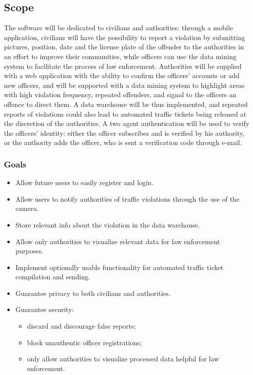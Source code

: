 \documentclass[12pt,a4paper]{article}
\begin{document}
\subsection{Scope}
The software will be dedicated to civilians and authorities: through a mobile application, civilians will have the possibility to report a violation by submitting pictures, position, date and the license plate of the offender to the authorities in an effort to improve their communities, while officers can use the data mining system to facilitate the process of law enforcement. Authorities will be supplied with a web application with the ability to confirm the officers' accounts or add new officers, and will be supported with a data mining system to highlight areas with high violation frequency, repeated offenders, and signal to the officers an offence to direct them.
A data warehouse will be thus implemented, and repeated reports of violations could also lead to automated traffic tickets being released at the discretion of the authorities.
A two agent authentication will be used to verify the officers' identity: either the officer subscribes and is verified by his authority, or the authority adds the officer, who is sent a verification code through e-mail.
\subsubsection{Goals}
\begin{itemize}
\item Allow future users to easily register and login. 
\item Allow users to notify authorities of traffic violations through the use of the camera.
\item Store relevant info about the violation in the data warehouse.
\item Allow only authorities to visualize relevant data for law enforcement purposes.
\item Implement optionally usable functionality for automated traffic ticket compilation and sending.
\item Guarantee privacy to both civilians and authorities.
\item Guarantee security: 
\begin{itemize}
	\item discard and discourage false reports;
	\item block unauthentic officer registrations;
    \item only allow authorities to visualize processed data helpful for law enforcement.
\end{itemize}
\end{itemize}
\end{document}
